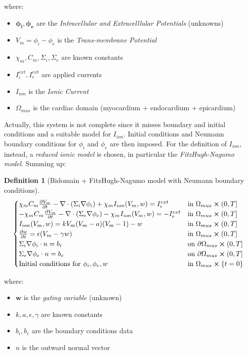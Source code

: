 \documentclass[a4paper,12pt]{article}
\newtheorem{definition}{Definition}
\begin{document}
	where:
	\begin{itemize}[label=\textendash]
		\item $\bm{\phi_i, \phi_e}$ are the \emph{Intracellular and Extracelllular Potentials} (unknowns)
		\item $V_m = \phi_i-\phi_e$ is the \emph{Trans-membrane Potential}
		\item $\chi_m,C_m, \Sigma_i, \Sigma_e$ are known constants
		\item $I_i^{ext},I_e^{ext}$ are applied currents
		\item $I_{ion}$ is the \emph{Ionic Current}
		\item $\Omega_{mus}$ is the cardiac domain (myocardium + endocardium + epicardium)
	\end{itemize}
    
    \vspace{4mm}
    \noindent Actually, this system is not complete since it misses boundary and initial conditions and a suitable model for $I_{ion}$. Initial conditions and Neumann boundary conditions for $\phi_i$ and $\phi_e$ are then imposed. For the definition of $I_{ion}$, instead, a \emph{reduced ionic model} is chosen, in particular the \emph{FitzHugh-Nagumo model}. Summing up:
    
    \begin{definition}[Bidomain + FitzHugh-Nagumo model with Neumann boundary conditions]\label{def1}
    	\begin{equation*}
    	\begin{cases}
    	\chi_m C_m\pdv{V_m}{t} - \nabla \cdot (\Sigma_i \nabla \phi_i) + \chi_m I_{ion}(V_m,w) = I_i^{ext}    & \text{in } \Omega_{mus} \cross (0,T]
    	\\
    	-\chi_m C_m\pdv{V_m}{t} - \nabla \cdot (\Sigma_e \nabla \phi_e) - \chi_m I_{ion}(V_m,w) = -I_e^{ext}    & \text{in } \Omega_{mus} \cross (0,T]
    	\\
    	I_{ion}(V_m,w)=kV_m(V_m-a)(V_m-1)-w & \text{in } \Omega_{mus} \cross (0,T]
    	\\
    	\pdv{w}{t} = \epsilon(V_m-\gamma w)  & \text{in } \Omega_{mus} \cross (0,T]
    	\\
    	\Sigma_i\nabla \phi_i \cdot n = b_i   & \text{on } \partial \Omega_{mus} \cross (0,T]
    	\\
    	\Sigma_e\nabla \phi_e \cdot n = b_e   & \text{on } \partial \Omega_{mus} \cross (0,T]
    	\\
    	\text{Initial conditions for } \phi_i,\phi_e, w & \text{in } \Omega_{mus}\cross\{t=0\}
    	\end{cases}
    	\end{equation*}
    \end{definition}
    \vspace{3mm}
    where:
    \begin{itemize}[label=\textendash]
    	\item $\bm{w}$ is the \emph{gating variable} (unknown)
    	\item $k,a,\epsilon,\gamma$ are known constants
    	\item $b_i,b_e$ are the boundary conditions data
    	\item $n$ is the outward normal vector
    \end{itemize}
\end{document}
